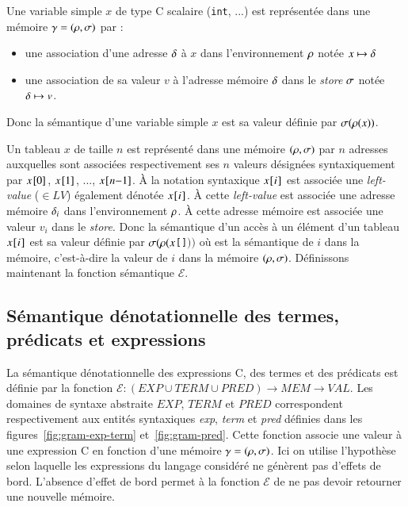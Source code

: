 Une variable simple $x$ de type C scalaire (\lstinline'int', ...) est
représentée dans une mémoire $\gamma = (\rho, \sigma)$ par :

\begin{itemize}
\item une association d'une adresse $\delta$ à $x$ dans l'environnement $\rho$
  notée $x \mapsto \delta$
\item une association de sa valeur $v$ à l'adresse mémoire $\delta$ dans le
  {\em store} $\sigma$ notée $\delta \mapsto v$.
\end{itemize}

Donc la sémantique d'une variable simple $x$ est sa valeur définie par
$\sigma(\rho(x))$.

Un tableau $x$ de taille $n$ est représenté dans une mémoire $(\rho, \sigma)$
par $n$ adresses auxquelles sont associées respectivement ses $n$ valeurs
désignées syntaxiquement par $x\mbox{\lstinline'[0]'}$,
$x\mbox{\lstinline'[1]'}$, ..., $x\mbox{\lstinline'['}n\mbox{\lstinline'-1]'}$.
À la notation syntaxique $x\mbox{\lstinline'['}i\mbox{\lstinline']'}$ est
associée une {\em left-value} ($\in LV$) également dénotée
$x\mbox{\lstinline'['}i\mbox{\lstinline']'}$.
À cette {\em left-value} est associée une adresse mémoire $\delta_i$ dans
l'environnement $\rho$.
À cette adresse mémoire est associée une valeur $v_i$ dans le {\em store}.
Donc la sémantique d'un accès à un élément d'un tableau
$x\mbox{\lstinline'['}i\mbox{\lstinline']'}$ est sa valeur définie par
$\sigma(\rho(x$\lstinline'['\lstinline']'$))$ où
 est la sémantique de $i$ dans la mémoire,
c'est-à-dire la valeur de $i$ dans la mémoire $(\rho, \sigma)$.
Définissons maintenant la fonction sémantique $\mathcal{E}$.


\subsection{Sémantique dénotationnelle des termes, prédicats et expressions}



La sémantique dénotationnelle des expressions C, des termes et des prédicats
\eacsl est définie par la fonction
$\mathcal{E} : (EXP \cup TERM \cup PRED) \rightarrow MEM \rightarrow VAL$.
Les domaines de syntaxe abstraite $EXP$, $TERM$ et $PRED$ correspondent
respectivement aux entités syntaxiques \textit{exp}, \textit{term} et
\textit{pred} définies dans les figures~\ref{fig:gram-exp-term}
et~\ref{fig:gram-pred}.
Cette fonction associe une valeur à une expression C en fonction d'une mémoire
$\gamma = (\rho, \sigma)$.
Ici on utilise l'hypothèse selon laquelle les expressions du langage considéré
ne génèrent pas d'effets de bord.
L'absence d'effet de bord permet à la fonction $\mathcal{E}$ de ne pas devoir
retourner une nouvelle mémoire.

